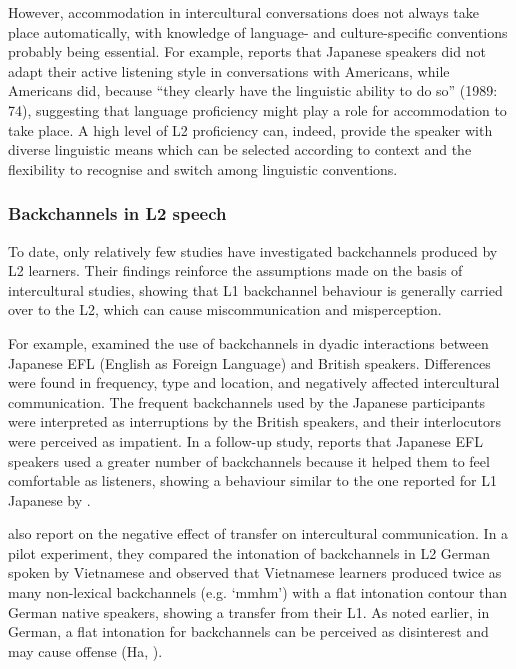 However, accommodation in intercultural conversations does not always take place automatically, with knowledge of language- and culture-specific conventions probably being essential. For example, \citet{White1989} reports that Japanese speakers did not adapt their active listening style in conversations with Americans, while Americans did, because “they clearly have the linguistic ability to do so” (1989: 74), suggesting that language proficiency might play a role for accommodation to take place. A high level of L2 proficiency can, indeed, provide the speaker with diverse linguistic means which can be selected according to context and the flexibility to recognise and switch among linguistic conventions.

\subsubsection{Backchannels in L2 speech}
\hypertarget{Toc191305946}{}
To date, only relatively few studies have investigated backchannels produced by L2 learners. Their findings reinforce the assumptions made on the basis of intercultural studies, showing that L1 backchannel behaviour is generally carried over to the L2, which can cause miscommunication and misperception.

For example, \citet{Cutrone2005} examined the use of backchannels in dyadic interactions between Japanese EFL (English as Foreign Language) and British speakers. Differences were found in frequency, type and location, and negatively affected intercultural communication. The frequent backchannels used by the Japanese participants were interpreted as interruptions by the British speakers, and their interlocutors were perceived as impatient. In a follow-up study, \citet{Cutrone2014} reports that Japanese EFL speakers used a greater number of backchannels because it helped them to feel comfortable as listeners, showing a behaviour similar to the one reported for L1 Japanese by \citet{ClancyEtAl1996}.

\citet{WehrleGrice2019} also report on the negative effect of transfer on intercultural communication. In a pilot experiment, they compared the intonation of backchannels in L2 German spoken by Vietnamese and observed that Vietnamese learners produced twice as many non-lexical backchannels (e.g. ‘mmhm’) with a flat intonation contour than German native speakers, showing a transfer from their L1. As noted earlier, in German, a flat intonation for backchannels can be perceived as disinterest and may cause offense (Ha, \citealt{EbnerGrice2016}).

